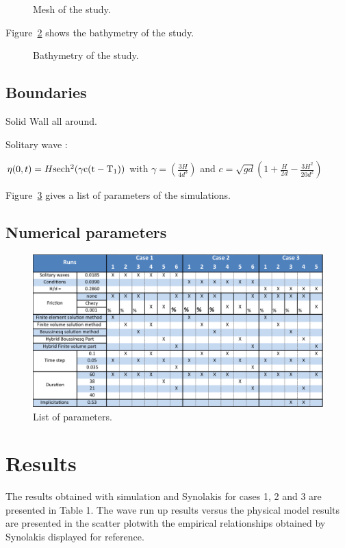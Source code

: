 \begin{figure}[H]
\centering
{}
\caption{Mesh of the study.}
\label{fig:tests:mesh}
\end{figure}

Figure~\ref{fig:tests:bathy} shows the bathymetry of the study.

\begin{figure}[H]
\centering
{}
\caption{Bathymetry of the study.}
\label{fig:tests:bathy}
\end{figure}

\subsection{Boundaries}

Solid Wall all around.

Solitary wave :

$\eta(0,t) = H \rm{sec } h^{2}(\gamma c(t-T_{1}))$ with $\gamma=(\frac{3H}{4d^{3}})$ and
$c=\sqrt{gd}(1+\frac{H}{2d}-\frac{3H^{2}}{20d^{2}})$

Figure~\ref{fig:tests:params} gives a list of parameters of the simulations.

\subsection{Numerical parameters}
\begin{figure}
\centering
\includegraphics[width=.6\textwidth]{img/run_param.png}
\caption{List of parameters.}
\label{fig:tests:params}
\end{figure}

\section{Results}

The results obtained with  simulation and Synolakis for cases 1, 2
and 3 are presented in Table 1. The  wave run up results versus the
physical model results are presented in the scatter plotwith the empirical
relationships obtained by Synolakis displayed for reference.

